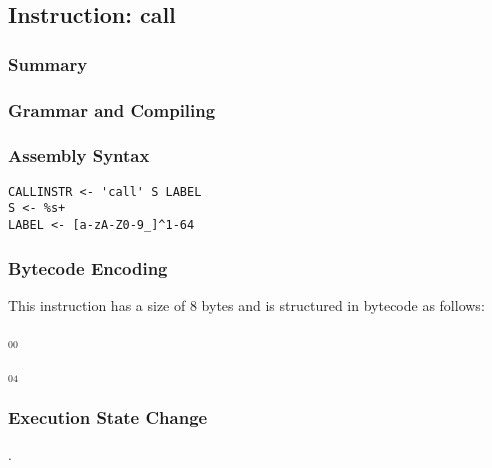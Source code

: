 \subsection{Instruction: call}

\subsubsection{Summary}


\subsubsection{Grammar and Compiling}


\subsubsection{Assembly Syntax}

\begin{myquote}
\begin{verbatim}
CALLINSTR <- 'call' S LABEL
S <- %s+
LABEL <- [a-zA-Z0-9_]^1-64
\end{verbatim}
\end{myquote}


\subsubsection{Bytecode Encoding}

This instruction has a size of 8 bytes and is structured in bytecode as follows:

$_{00}$\ 



$_{04}$\ 


\subsubsection{Execution State Change}

.


